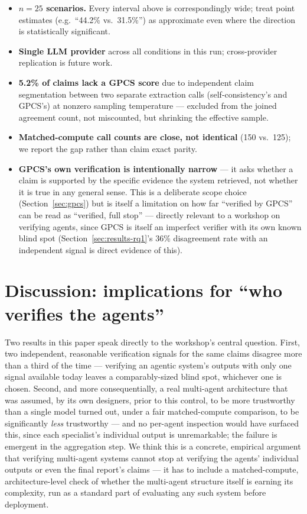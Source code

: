 \documentclass{article}
\begin{document}
\begin{itemize}
    \item \textbf{$n=25$ scenarios.} Every interval above is
    correspondingly wide; treat point estimates (e.g.\ ``44.2\% vs.\
    31.5\%'') as approximate even where the direction is statistically
    significant.
    \item \textbf{Single LLM provider} across all conditions in this run;
    cross-provider replication is future work.
    \item \textbf{5.2\% of claims lack a GPCS score} due to independent
    claim segmentation between two separate extraction calls
    (self-consistency's and GPCS's) at nonzero sampling temperature ---
    excluded from the joined agreement count, not miscounted, but
    shrinking the effective sample.
    \item \textbf{Matched-compute call counts are close, not identical}
    (150 vs.\ 125); we report the gap rather than claim exact parity.
    \item \textbf{GPCS's own verification is intentionally narrow} --- it
    asks whether a claim is supported by the specific evidence the system
    retrieved, not whether it is true in any general sense. This is a
    deliberate scope choice (Section~\ref{sec:gpcs}) but is itself a
    limitation on how far ``verified by GPCS'' can be read as ``verified,
    full stop'' --- directly relevant to a workshop on verifying agents,
    since GPCS is itself an imperfect verifier with its own known blind
    spot (Section~\ref{sec:results-rq1}'s 36\% disagreement rate with an
    independent signal is direct evidence of this).
\end{itemize}

\section{Discussion: implications for ``who verifies the agents''}
\label{sec:discussion}

Two results in this paper speak directly to the workshop's central
question. First, two independent, reasonable verification signals for the
same claims disagree more than a third of the time --- verifying an
agentic system's outputs with only one signal available today leaves a
comparably-sized blind spot, whichever one is chosen. Second, and more
consequentially, a real multi-agent architecture that was assumed, by its
own designers, prior to this control, to be more trustworthy than a
single model turned out, under a fair matched-compute comparison, to be
significantly \emph{less} trustworthy --- and no per-agent inspection
would have surfaced this, since each specialist's individual output is
unremarkable; the failure is emergent in the aggregation step. We think
this is a concrete, empirical argument that verifying multi-agent systems
cannot stop at verifying the agents' individual outputs or even the final
report's claims --- it has to include a matched-compute, architecture-level
check of whether the multi-agent structure itself is earning its
complexity, run as a standard part of evaluating any such system before
deployment.
\end{document}
